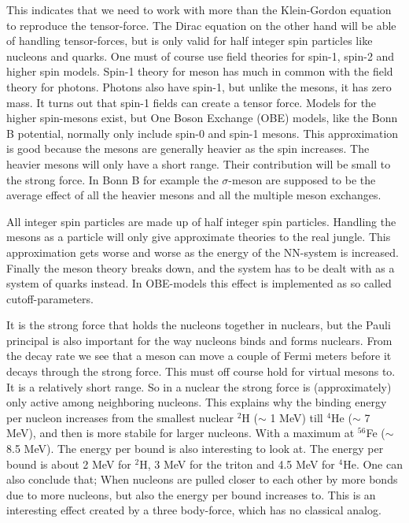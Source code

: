 This indicates that we need to work with more than
the Klein-Gordon equation to reproduce the tensor-force.
The Dirac equation on the other hand will be able of handling tensor-forces, 
but is only valid for half integer spin particles like nucleons and quarks.
One must of course use field theories for spin-1, spin-2 and higher spin models.
Spin-1 theory for meson has much in common with the field theory for photons. 
Photons also have spin-1, but unlike the mesons, it has zero mass. 
It turns out that spin-1 fields can create a tensor force.
Models for the higher spin-mesons exist, but
One Boson Exchange (OBE) models, like the Bonn B potential, normally only include spin-0 and spin-1 mesons.
This approximation is good because the mesons are generally heavier as the spin increases.
The heavier mesons will only have a short range. Their contribution will be small to the strong force.
In Bonn B for example the $\sigma$-meson are supposed to be the average effect of all the heavier mesons and all the
multiple meson exchanges.



All integer spin particles are made up of half integer spin particles. 
Handling the mesons as a particle will only give approximate theories to the real jungle.
This approximation gets worse and worse as the energy of the NN-system is increased. 
Finally the meson theory breaks down, and the system has to be dealt with as a system of quarks instead.
In OBE-models this effect is implemented as so called cutoff-parameters.

It is the strong force that holds the nucleons together in nuclears, but the Pauli principal is 
also important for the way nucleons binds and forms nuclears. 
From the decay rate we see that a meson can move a 
couple of Fermi meters before it decays through the strong force. This must off course hold for virtual mesons to. 
It is a relatively short 
range. So in a nuclear the strong force is (approximately) only active among neighboring nucleons. 
This explains why the binding energy per nucleon increases from the smallest nuclear ${}^2$H ($\sim$ 1 MeV) till 
${}^4$He ($\sim$ 7 MeV), 
and then is more stabile for larger nucleons. With a maximum at ${}^{56}$Fe ($\sim$ 8.5 MeV). 
The energy per bound is also interesting to look at.
The energy per bound is about 2 MeV for ${}^2$H, 3 MeV for the triton and 4.5 MeV for ${}^4$He. 
One can also conclude that; When nucleons are pulled closer to each other by more bonds due to more nucleons, 
but also the energy per bound increases to. This is an interesting effect created by a three body-force, which
has no classical analog.


